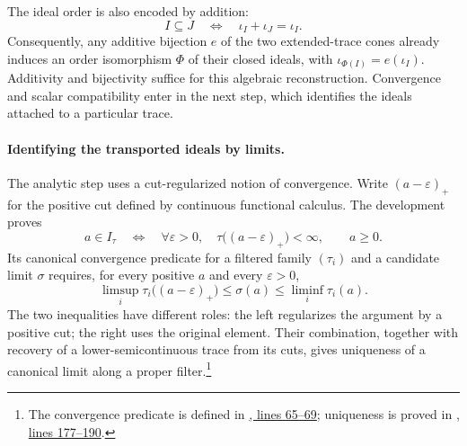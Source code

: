 The ideal order is also encoded by addition:
\begin{equation}
  I\subseteq J\quad\Longleftrightarrow\quad
  \iota_I+\iota_J=\iota_I.
  \label{eq:ideal-addition-order}
\end{equation}
Consequently, any additive bijection $e$ of the two extended-trace cones
already induces an order isomorphism $\Phi$ of their closed ideals, with
$\iota_{\Phi(I)}=e(\iota_I)$. Additivity and bijectivity suffice for this algebraic reconstruction. Convergence and scalar compatibility enter in the next step, which identifies the ideals attached to a particular trace.

\paragraph{Identifying the transported ideals by limits.}
The analytic step uses a cut-regularized notion of convergence. Write $(a-\varepsilon)_+$ for the positive cut defined by
continuous functional calculus. The development proves
\begin{equation}
  a\in I_\tau\quad\Longleftrightarrow\quad
  \forall\varepsilon>0,\quad
  \tau\bigl((a-\varepsilon)_+\bigr)<\infty,
  \qquad a\geq0.
  \label{eq:finite-ideal-cuts}
\end{equation}
Its canonical convergence predicate for a filtered family $(\tau_i)$ and
a candidate limit $\sigma$ requires, for every positive $a$ and every
$\varepsilon>0$,
\begin{equation}
  \limsup_i\tau_i\bigl((a-\varepsilon)_+\bigr)
  \leq\sigma(a)\leq\liminf_i\tau_i(a).
  \label{eq:trace-canonical-convergence}
\end{equation}
The two inequalities have different roles: the left regularizes the
argument by a positive cut; the right uses the original element. Their
combination, together with recovery of a lower-semicontinuous trace from
its cuts, gives uniqueness of a canonical limit along a proper filter.\footnote{The convergence predicate is defined in
\href{https://github.com/openai/math/blob/fd4aeeb2ee4fc729c18d98444fed42fd0529eeeb/lean/OAI/Analysis/TraceCone/Basic.lean\#L65-L69}{, lines 65--69}; uniqueness is proved in
\href{https://github.com/openai/math/blob/fd4aeeb2ee4fc729c18d98444fed42fd0529eeeb/lean/OAI/Analysis/TraceCone/IdealTransport.lean\#L177-L190}{, lines 177--190}.}

